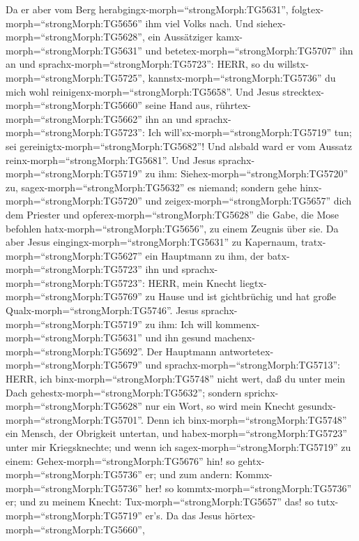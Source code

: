  Da er aber vom Berg
herabgingx-morph=``strongMorph:TG5631'',
folgtex-morph=``strongMorph:TG5656'' ihm viel Volks nach. 
Und siehex-morph=``strongMorph:TG5628'', ein Aussätziger
kamx-morph=``strongMorph:TG5631'' und
betetex-morph=``strongMorph:TG5707'' ihn an und
sprachx-morph=``strongMorph:TG5723'': HERR, so du
willstx-morph=``strongMorph:TG5725'',
kannstx-morph=``strongMorph:TG5736'' du mich wohl
reinigenx-morph=``strongMorph:TG5658''.  Und Jesus
strecktex-morph=``strongMorph:TG5660'' seine Hand aus,
rührtex-morph=``strongMorph:TG5662'' ihn an und
sprachx-morph=``strongMorph:TG5723'': Ich
will'sx-morph=``strongMorph:TG5719'' tun; sei
gereinigtx-morph=``strongMorph:TG5682''! Und alsbald ward er vom Aussatz
reinx-morph=``strongMorph:TG5681''.  Und Jesus
sprachx-morph=``strongMorph:TG5719'' zu ihm:
Siehex-morph=``strongMorph:TG5720'' zu,
sagex-morph=``strongMorph:TG5632'' es niemand; sondern gehe
hinx-morph=``strongMorph:TG5720'' und
zeigex-morph=``strongMorph:TG5657'' dich dem Priester und
opferex-morph=``strongMorph:TG5628'' die Gabe, die Mose befohlen
hatx-morph=``strongMorph:TG5656'', zu einem Zeugnis über sie.
 Da aber Jesus eingingx-morph=``strongMorph:TG5631'' zu
Kapernaum, tratx-morph=``strongMorph:TG5627'' ein Hauptmann zu ihm, der
batx-morph=``strongMorph:TG5723'' ihn  und
sprachx-morph=``strongMorph:TG5723'': HERR, mein Knecht
liegtx-morph=``strongMorph:TG5769'' zu Hause und ist gichtbrüchig und
hat große Qualx-morph=``strongMorph:TG5746''.  Jesus
sprachx-morph=``strongMorph:TG5719'' zu ihm: Ich will
kommenx-morph=``strongMorph:TG5631'' und ihn gesund
machenx-morph=``strongMorph:TG5692''.  Der Hauptmann
antwortetex-morph=``strongMorph:TG5679'' und
sprachx-morph=``strongMorph:TG5713'': HERR, ich
binx-morph=``strongMorph:TG5748'' nicht wert, daß du unter mein Dach
gehestx-morph=``strongMorph:TG5632''; sondern
sprichx-morph=``strongMorph:TG5628'' nur ein Wort, so wird mein Knecht
gesundx-morph=``strongMorph:TG5701''.  Denn ich
binx-morph=``strongMorph:TG5748'' ein Mensch, der Obrigkeit untertan,
und habex-morph=``strongMorph:TG5723'' unter mir Kriegsknechte; und wenn
ich sagex-morph=``strongMorph:TG5719'' zu einem:
Gehex-morph=``strongMorph:TG5676'' hin! so
gehtx-morph=``strongMorph:TG5736'' er; und zum andern:
Kommx-morph=``strongMorph:TG5736'' her! so
kommtx-morph=``strongMorph:TG5736'' er; und zu meinem Knecht:
Tux-morph=``strongMorph:TG5657'' das! so
tutx-morph=``strongMorph:TG5719'' er's.  Da das Jesus
hörtex-morph=``strongMorph:TG5660'',

